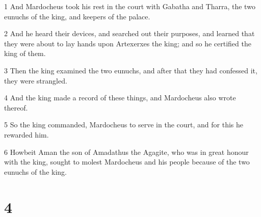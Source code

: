 \par 1 And Mardocheus took his rest in the court with Gabatha and Tharra, the two eunuchs of the king, and keepers of the palace.
\par 2 And he heard their devices, and searched out their purposes, and learned that they were about to lay hands upon Artexerxes the king; and so he certified the king of them.
\par 3 Then the king examined the two eunuchs, and after that they had confessed it, they were strangled.
\par 4 And the king made a record of these things, and Mardocheus also wrote thereof.
\par 5 So the king commanded, Mardocheus to serve in the court, and for this he rewarded him.
\par 6 Howbeit Aman the son of Amadathus the Agagite, who was in great honour with the king, sought to molest Mardocheus and his people because of the two eunuchs of the king.

\chapter{4}

